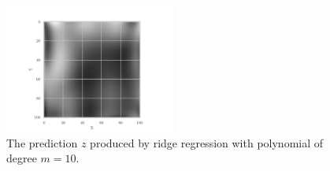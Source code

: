 \begin{figure}[htbp]
\centering
\label{fig:terrainpic_ridge}
\includegraphics[width=0.5\textwidth]{../figures/terrainpicture_ridge}
	\caption{The prediction $z$ produced by ridge regression with polynomial of degree $m=10$.}
\end{figure}

